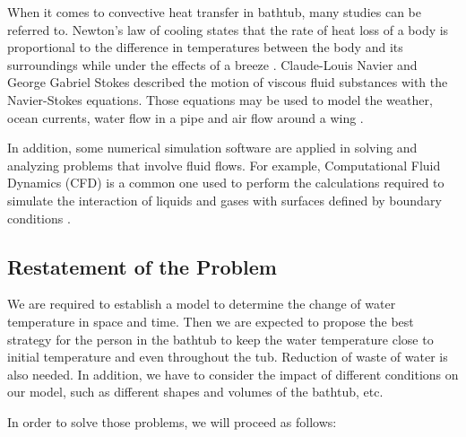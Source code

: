 \documentclass{mcmthesis}
\begin{document}
When it comes to convective heat transfer in bathtub, many studies can be referred to. Newton's law of cooling states that the rate of heat loss of a body is proportional to the difference in temperatures between the body and its surroundings while under the effects of a breeze \cite{2}. Claude-Louis Navier and George Gabriel Stokes described the motion of viscous fluid substances with the Navier-Stokes equations. Those equations may be used to model the weather, ocean currents, water flow in a pipe and air flow around a wing \cite{3}.

In addition, some numerical simulation software are applied in solving and analyzing problems that involve fluid flows. For example, Computational Fluid Dynamics (CFD) is a common one used to perform the calculations required to simulate the interaction of liquids and gases with surfaces defined by boundary conditions \cite{4}.

\subsection{Restatement of the Problem}

We are required to establish a model to determine the change of water temperature in space and time. Then we are expected to propose the best strategy for the person in the bathtub to keep the water temperature close to initial temperature and even throughout the tub. Reduction of waste of water is also needed. In addition, we have to consider the impact of different conditions on our model, such as different shapes and volumes of the bathtub, etc.

In order to solve those problems, we will proceed as follows:
\end{document}
